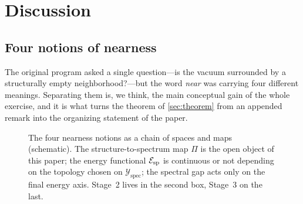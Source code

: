 \documentclass[11pt,a4paper]{article}
\theoremstyle{definition}
\theoremstyle{remark}
\newcommand{\Yspec}{\mathcal{Y}_{\mathrm{spec}}}
\begin{document}
\section{Discussion}\label{sec:discussion}

\subsection{Four notions of nearness}\label{ssec:four}
The original program asked a single question---is the vacuum surrounded by a structurally empty neighborhood?---but the word \emph{near} was carrying four different meanings. Separating them is, we think, the main conceptual gain of the whole exercise, and it is what turns the theorem of \cref{sec:theorem} from an appended remark into the organizing statement of the paper.

\begin{figure}[t]
\centering
{}
\caption{The four nearness notions as a chain of spaces and maps (schematic). The structure-to-spectrum map $\Pi$ is the open object of this paper; the energy functional $\mathcal E_{\rm sp}$ is continuous or not depending on the topology chosen on $\Yspec$; the spectral gap acts only on the final energy axis. Stage~2 lives in the second box, Stage~3 on the last.}\label{fig:chain}
\end{figure}
\end{document}
